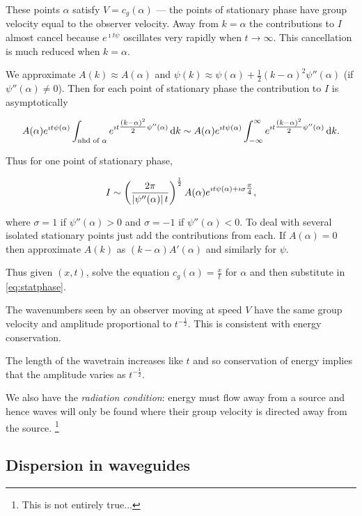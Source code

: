 \documentclass{notes}
\begin{document}
These points $\alpha$ satisfy $V = c_g(\alpha)$ --- the points of
stationary phase have group velocity equal to the observer velocity.
Away from $k=\alpha$ the contributions to $I$ almost cancel
because $e^{\imath t \psi}$ oscillates very rapidly when $t \to \infty$.
This cancellation is much reduced when $k = \alpha$.

We approximate $A(k) \approx A(\alpha)$ and
$\psi(k) \approx \psi(\alpha) + \tfrac{1}{2} (k-\alpha)^2 \psi''(\alpha)$
(if $\psi''(\alpha) \neq 0$).  Then for each point of
stationary phase the contribution to $I$ is asymptotically

\[
A(\alpha) e^{\imath t \psi(\alpha)} \int_{\text{nhd of $\alpha$}}
e^{\imath t \tfrac{(k-\alpha)^2}{2} \psi''(\alpha)}\, \mathrm{d} k
 \sim A(\alpha) e^{\imath t \psi(\alpha)} \int_{-\infty}^\infty
e^{\imath t \tfrac{(k-\alpha)^2}{2} \psi''(\alpha)}\, \mathrm{d} k.
\]

Thus for one point of stationary phase,

\begin{equation}\label{eq:statphase}
I \sim \left( \frac{2 \pi}{\left|\psi''(\alpha)\right| t} \right)^{\frac{1}{2}}
A(\alpha) e^{\imath t \psi(\alpha) + \imath \sigma \tfrac{\pi}{4}},
\end{equation}

where $\sigma = 1$ if $\psi''(\alpha) > 0$ and $\sigma = -1$
if $\psi''(\alpha) < 0$.  To deal with several isolated stationary points
just add the contributions from each.  If $A(\alpha) = 0$ then
approximate $A(k)$ as $(k - \alpha) A'(\alpha)$ and similarly for $\psi$.

Thus given $(x,t)$, solve the equation $c_g(\alpha) = \tfrac{x}{t}$ for
$\alpha$ and then substitute in \eqref{eq:statphase}.

The wavenumbers seen by an observer moving at speed $V$ have the
same group velocity and amplitude proportional to
$t^{-\frac{1}{2}}$.  This is consistent with energy conservation.

\vspace{1.5in}

The length of the wavetrain increases like $t$ and so conservation
of energy implies that the amplitude varies as $t^{-\frac{1}{2}}$.

We also have the \emph{radiation condition}: energy must flow
away from a source and hence waves will only be found where their
group velocity is directed away from the source.%
\footnote{This is not entirely true...}

\subsection{Dispersion in waveguides}
\end{document}
